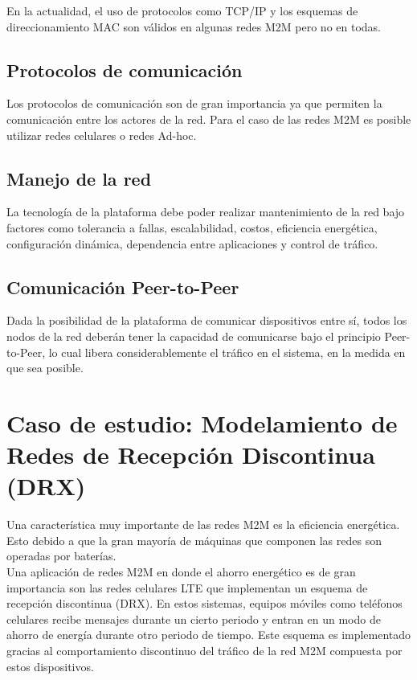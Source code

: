 \documentclass[journal]{IEEEtran}
\begin{document}
En la actualidad, el uso de protocolos como TCP/IP y los esquemas de direccionamiento MAC son válidos en algunas redes M2M pero no en todas.

\subsection{Protocolos de comunicación}

Los protocolos de comunicación son de gran importancia ya que permiten la comunicación entre los actores de la red. Para el caso de las redes M2M es posible utilizar redes celulares o redes Ad-hoc.

\subsection{Manejo de la red}

La tecnología de la plataforma debe poder realizar mantenimiento de la red bajo factores como tolerancia a fallas, escalabilidad, costos, eficiencia energética, configuración dinámica, dependencia entre aplicaciones y control de tráfico.

\subsection{Comunicación Peer-to-Peer}

Dada la posibilidad de la plataforma de comunicar dispositivos entre sí, todos los nodos de la red deberán tener la capacidad de comunicarse bajo el principio Peer-to-Peer, lo cual libera considerablemente el tráfico en el sistema, en la medida en que sea posible.

\section{Caso de estudio: Modelamiento de Redes de Recepción Discontinua (DRX)}

Una característica muy importante de las redes M2M es la eficiencia energética. Esto debido a que la gran mayoría de máquinas que componen las redes son operadas por baterías.\\

Una aplicación de redes M2M en donde el ahorro energético es de gran importancia son las redes celulares LTE que implementan un esquema de recepción discontinua (DRX). En estos sistemas, equipos móviles como teléfonos celulares recibe mensajes durante un cierto periodo y entran en un modo de ahorro de energía durante otro periodo de tiempo. Este esquema es implementado gracias al comportamiento discontinuo del tráfico de la red M2M compuesta por estos dispositivos.\\
\end{document}
